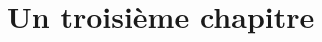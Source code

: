 

\begin{comment}

\documentclass[a4paper, 11pt, twoside, fleqn]{memoir}





	\openleft %

\end{comment}

	\chapter{Un troisième chapitre}
	\ChapFrame %
	\lipsum[1-4]

%

